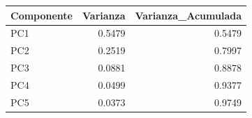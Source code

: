 \begin{tabular}{lrr}
\toprule
Componente & Varianza & Varianza\_Acumulada \\
\midrule
PC1 & 0.5479 & 0.5479 \\
PC2 & 0.2519 & 0.7997 \\
PC3 & 0.0881 & 0.8878 \\
PC4 & 0.0499 & 0.9377 \\
PC5 & 0.0373 & 0.9749 \\
\bottomrule
\end{tabular}

